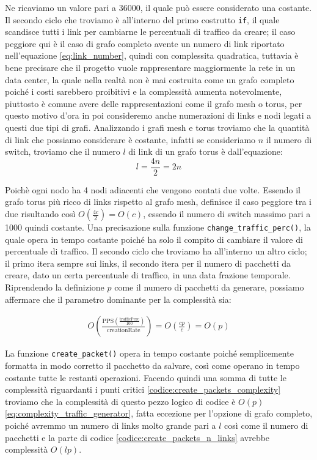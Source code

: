 \documentclass[binding=0.6cm]{sapthesis}
\begin{document}
Ne ricaviamo un valore pari a 36000, il quale può essere considerato una costante. Il secondo ciclo che troviamo è all'interno del primo costrutto \lstinline|if|, il quale scandisce tutti i link per cambiarne le percentuali di traffico da creare; il caso peggiore qui è il caso di grafo completo avente un numero di link
riportato nell'equazione \ref{eq:link_number}, quindi con complessita quadratica, tuttavia è bene precisare che il progetto vuole rappresentare maggiormente la rete in un data center, la quale nella realtà non è mai costruita come un grafo completo poiché i costi sarebbero proibitivi e la complessità aumenta notevolmente, piuttosto è comune avere delle 
rappresentazioni come il grafo mesh o torus, per questo motivo d'ora in poi consideremo anche numerazioni di links e nodi legati a questi due tipi di grafi. Analizzando i grafi mesh e torus troviamo che la quantità di link che possiamo considerare è costante, infatti
se consideriamo \(n\) il numero di switch, troviamo che il numero \(l\) di link di un grafo torus è dall'equazione:
\begin{equation}
    l = \frac{4n}{2} = 2n
    \label{eq:torus_link_number}
\end{equation}

Poichè ogni nodo ha 4 nodi adiacenti che vengono contati due volte. Essendo il grafo torus più ricco di links rispetto al grafo mesh, definisce il caso peggiore tra i due risultando così \(O(\frac{4c}{2}) = O(c)\), essendo il numero di switch massimo pari a 1000 quindi costante.
Una precisazione sulla funzione \lstinline|change_traffic_perc()|, la quale opera in tempo costante poiché ha solo il compito di cambiare il valore di percentuale di traffico.
Il secondo ciclo che troviamo ha all'interno un altro ciclo; il primo itera sempre sui links, il secondo itera per il numero di pacchetti da creare, dato un certa percentuale di traffico, in una data frazione temporale.
Riprendendo la definizione \(p\) come il numero di pacchetti da generare, possiamo affermare che il parametro dominante per la complessità sia:

\begin{align}
    O(\frac{\text{PPS}(\frac{\text{trafficPerc}}{100})}{\text{creationRate}}) = O(\frac{cp}{c}) = O(p)
    \label{eq:packets_per_fractional_time}
\end{align}

La funzione \lstinline|create_packet()| opera in tempo costante poiché semplicemente formatta in modo corretto il pacchetto da salvare, così come operano in tempo costante tutte le restanti operazioni.
Facendo quindi una somma di tutte le complessità riguardanti i punti critici \ref{codice:create_packets_complexity} 
troviamo che la complessità di questo pezzo logico di codice è \(O(p)\) \ref{eq:complexity_traffic_generator}, fatta eccezione per l'opzione di grafo completo, poiché avremmo un numero di
links molto grande pari a \(l\) così come il numero di pacchetti e la parte di codice \ref{codice:create_packets_n_links} avrebbe complessità \(O(lp)\).
\end{document}
